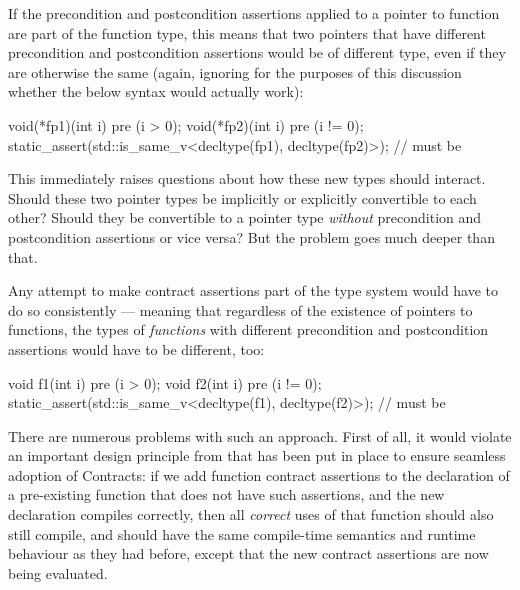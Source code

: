 If the precondition and postcondition assertions applied to a pointer to function are part of the function type, this means that two pointers that have different precondition and postcondition assertions would be of different type, even if they are otherwise the same (again, ignoring for the purposes of this discussion whether the below syntax would actually work):
\begin{codeblock}
void(*fp1)(int i) pre (i > 0);
void(*fp2)(int i) pre (i != 0);
static_assert(std::is_same_v<decltype(fp1), decltype(fp2)>);  // must be 
\end{codeblock}
This immediately raises questions about how these new types should interact. Should these two pointer types be implicitly or explicitly convertible to each other? Should they be convertible to a pointer type \emph{without} precondition and postcondition assertions or vice versa? But the problem goes much deeper than that.

Any attempt to make contract assertions part of the type system would have to do so consistently --- meaning that regardless of the existence of pointers to functions, the types of \emph{functions} with different precondition and postcondition assertions would have to be different, too:
\begin{codeblock}
void f1(int i) pre (i > 0);
void f2(int i) pre (i != 0);
static_assert(std::is_same_v<decltype(f1), decltype(f2)>);  // must be 
\end{codeblock}
There are numerous problems with such an approach. First of all, it would violate an important design principle from \cite{P2900R7} that has been put in place to ensure seamless adoption of Contracts: if we add function contract assertions to the declaration of a pre-existing function that does not have such assertions, and the new declaration compiles correctly, then all \emph{correct} uses of that function should also still compile, and should have the same compile-time semantics and runtime behaviour as they had before, except that the new contract assertions are now being evaluated.

